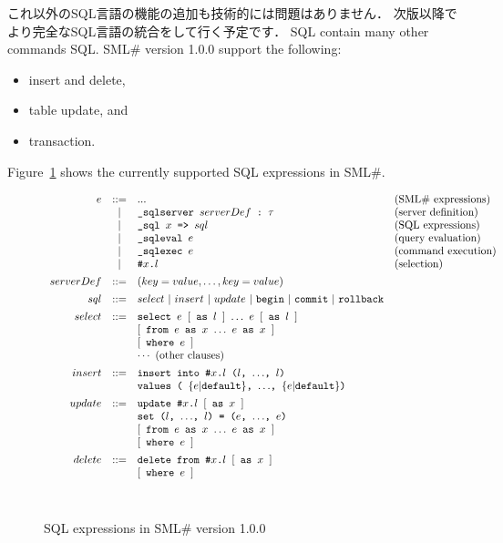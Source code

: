 \documentclass{jbook}
\newcommand{\smlsharp}{SML\#}
\newcommand{\version}{1.0.0}
\newcommand{\vbar}{\mbox{\ |\ }}
\newcommand{\code}[1]{\mbox{{\tt #1}}}
\begin{document}
	これ以外のSQL言語の機能の追加も技術的には問題はありません．
	次版以降でより完全なSQL言語の統合をして行く予定です．
\else%
	SQL contain many other commands SQL.
	\smlsharp{} version \version{} support the following:
\begin{itemize}
\item insert and delete,
\item table update, and
\item transaction.
\end{itemize}
	Figure~\ref{fig:sqlSyntax} shows the currently supported SQL expressions in
\smlsharp{}.
\begin{figure}
\begin{center}
\[
\begin{array}{rcll}
  e &::=& ... & \mbox{(\smlsharp{} expressions)}
\\  &|& \code{\_sqlserver $serverDef$~:~$\tau$} 
	& \mbox{(server definition)}
\\  &|& \code{\_sql $x$ => $sql$} 
	& \mbox{(SQL expressions)}
\\  &|& \code{\_sqleval $e$}
	& \mbox{(query evaluation)}
\\  &|& \code{\_sqlexec $e$}
	& \mbox{(command execution)}
\\  &|& \code{\#$x$.$l$}
	& \mbox{(selection)}
\\[1ex]
serverDef &::=& (key = value,\ldots,key = value)
\\[1ex]
  sql &::=& select
\vbar insert
\vbar update
\vbar \code{begin}
\vbar \code{commit}
\vbar \code{rollback}
\\[1ex]
select &::=& 
     \code{select $e$ $[$ as $l$ $]$ $\ldots$ $e$ $[$ as $l$ $]$}
\\&& \code{$[$ from $e$ as $x$ $\ldots$ $e$ as $x$ $]$}
\\&& \code{$[$ where $e$ $]$}
\\&& \cdots\ \mbox{(other clauses)}
\\[1ex]
insert &::=& 
\code{insert into \#$x$.$l$ ($l$, $\ldots$, $l$)}
\\&& \code{values ( $\{e|$default$\}$, $\ldots$, $\{e|$default$\}$)}
\\[1ex]
update &::=& 
   \code{update \#$x$.$l$ $[$ as $x$ $]$}
\\&& \code{set ($l$, $\ldots$, $l$) = ($e$, $\ldots$, $e$)}
\\&& \code{$[$ from $e$ as $x$ $\ldots$ $e$ as $x$ $]$}
\\&& \code{$[$ where $e$ $]$}
\\[1ex]
delete &::=& 
   \code{delete from \#$x$.$l$ $[$ as $x$ $]$}
\\&& \code{$[$ where $e$ $]$}
\end{array}
\]
\ \\
\caption{SQL expressions in \smlsharp{} version \version{}}
\end{center}
\label{fig:sqlSyntax}
\end{figure}
\end{document}
